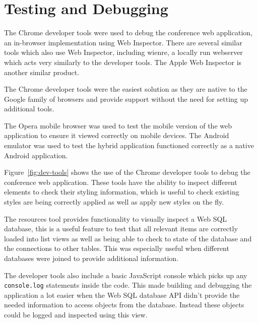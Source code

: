 \documentclass[10pt, a4paper]{article}
\begin{document}

\section{Testing and Debugging}
The Chrome developer tools were used to debug the conference web application,
an in-browser implementation using Web Inspector.%
There are several similar tools which also use Web Inspector, including wienre,
a locally run webserver which acts very similarly to the developer tools. The
Apple Web Inspector is another similar product.

The Chrome developer tools were the easiest solution as they are native to the
Google family of browsers and provide support without the need for setting up
additional tools.

The Opera mobile browser was used to test the mobile version of the web
application to ensure it viewed correctly on mobile devices. 
The Android emulator was used to test the hybrid application functioned
correctly as a native Android application.

Figure~\ref{fig:dev-tools} shows the use of the Chrome developer tools to debug
the conference web application. These tools have the ability to inspect
different elements to check their styling information, which is useful to check
existing styles are being correctly applied as well as apply new styles on the
fly.

The resources tool provides functionality to visually inspect a Web SQL
database, this is a useful feature to test that all relevant items are
correctly loaded into list views as well as being able to check to state of the
database and the connections to other tables. This was especially useful when
different databases were joined to provide additional information.

The developer tools also include a basic JavaScript console which picks up any
\texttt{console.log} statements inside the code. This made building and
debugging the application a lot easier when the Web SQL database API didn't
provide the needed information to access objects from the database. Instead
these objects could be logged and inspected using this view.
\end{document}
